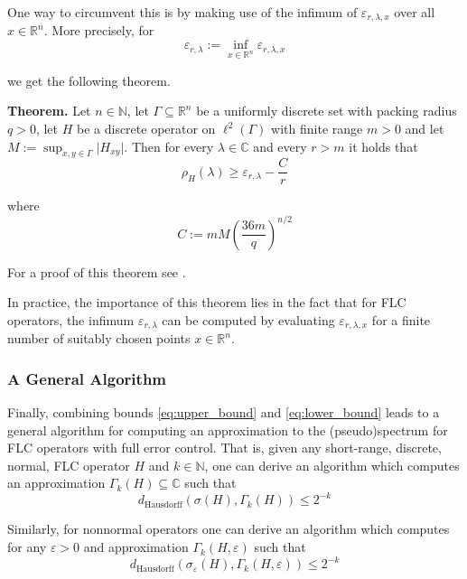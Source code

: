\documentclass[11pt]{article}
\begin{document}
One way to circumvent this is by making use of the infimum of $\varepsilon_{r, \lambda, x}$ over all $x \in \mathbb{R}^n$. More precisely, for
\begin{equation*}
    \varepsilon_{r, \lambda} := \inf_{x \in \mathbb{R}^n} \varepsilon_{r, \lambda, x}
\end{equation*}

we get the following theorem.

\textbf{Theorem.} Let $n \in \mathbb{N}$, let $\Gamma \subseteq \mathbb{R}^n$ be a uniformly discrete set with packing radius $q > 0$, let $H$ be a discrete operator on $\ell^2 (\Gamma)$ with finite range $m > 0$ and let $M := \sup_{x, y \in \Gamma} \vert H_{xy} \vert$. Then for every $\lambda \in \mathbb{C}$ and every $r > m$ it holds that
\begin{equation} \label{eq:lower_bound}
    \rho_H (\lambda) \geq \varepsilon_{r, \lambda} - \frac{C}{r}
\end{equation}

where
\begin{equation}
    C := m M \left( \frac{36m}{q} \right)^{n/2}
\end{equation}

For a proof of this theorem see \cite{paulhege2025}.

In practice, the importance of this theorem lies in the fact that for FLC operators, the infimum $\varepsilon_{r, \lambda}$ can be computed by evaluating $\varepsilon_{r, \lambda, x}$ for a finite number of suitably chosen points $x \in \mathbb{R}^n$.

\subsubsection{A General Algorithm}

Finally, combining bounds \ref{eq:upper_bound} and \ref{eq:lower_bound} leads to a general algorithm for computing an approximation to the (pseudo)spectrum for FLC operators with full error control. That is, given any short-range, discrete, normal, FLC operator $H$ and $k \in \mathbb{N}$, one can derive an algorithm which computes an approximation $\Gamma_k(H) \subseteq \mathbb{C}$ such that
\begin{equation}
    d_{\text{Hausdorff}} \left( \sigma(H), \Gamma_k(H) \right) \leq 2^{-k}
\end{equation}

Similarly, for nonnormal operators one can derive an algorithm which computes for any $\varepsilon > 0$ and approximation $\Gamma_k(H, \varepsilon)$ such that
\begin{equation}
    d_{\text{Hausdorff}} \left( \sigma_{\varepsilon}(H), \Gamma_k(H, \varepsilon) \right) \leq 2^{-k}
\end{equation}
\end{document}

